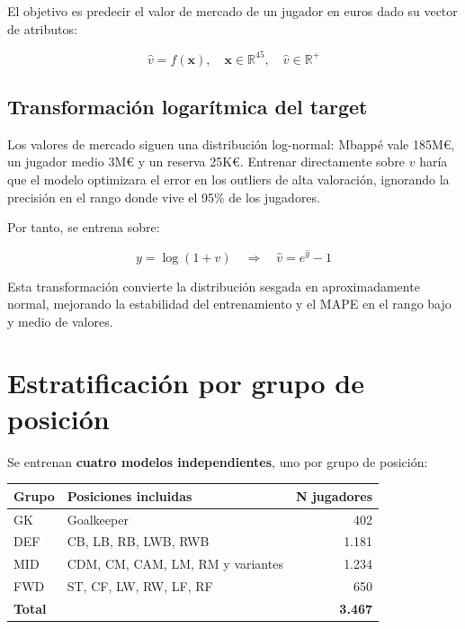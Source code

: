 \documentclass[12pt,a4paper]{report}
\begin{document}
El objetivo es predecir el valor de mercado de un jugador en euros dado su vector de atributos:

\begin{equation}
  \hat{v} = f(\mathbf{x}), \quad \mathbf{x} \in \mathbb{R}^{45}, \quad \hat{v} \in \mathbb{R}^+
\end{equation}

\subsection{Transformación logarítmica del target}

Los valores de mercado siguen una distribución log-normal: Mbappé vale 185M€, un jugador medio 3M€ y un reserva 25K€. Entrenar directamente sobre $v$ haría que el modelo optimizara el error en los outliers de alta valoración, ignorando la precisión en el rango donde vive el 95\% de los jugadores.

Por tanto, se entrena sobre:

\begin{equation}
  y = \log(1 + v) \quad \Rightarrow \quad \hat{v} = e^{\hat{y}} - 1
\end{equation}

Esta transformación convierte la distribución sesgada en aproximadamente normal, mejorando la estabilidad del entrenamiento y el MAPE en el rango bajo y medio de valores.

\section{Estratificación por grupo de posición}

Se entrenan \textbf{cuatro modelos independientes}, uno por grupo de posición:

\begin{center}
\begin{tabular}{llr}
\toprule
\textbf{Grupo} & \textbf{Posiciones incluidas} & \textbf{N jugadores} \\
\midrule
GK  & Goalkeeper & 402 \\
DEF & CB, LB, RB, LWB, RWB & 1.181 \\
MID & CDM, CM, CAM, LM, RM y variantes & 1.234 \\
FWD & ST, CF, LW, RW, LF, RF & 650 \\
\midrule
\textbf{Total} & & \textbf{3.467} \\
\bottomrule
\end{tabular}
\end{center}
\end{document}
